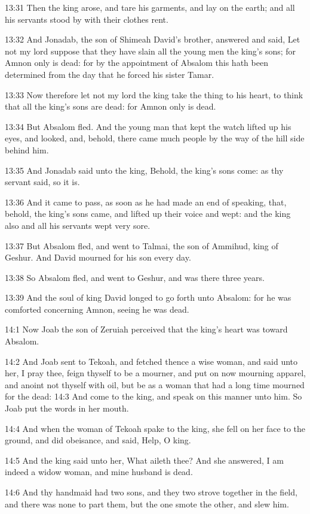 13:31 Then the king arose, and tare his garments, and lay on the earth; and all his servants stood by with their clothes rent.

13:32 And Jonadab, the son of Shimeah David's brother, answered and said, Let not my lord suppose that they have slain all the young men the king's sons; for Amnon only is dead: for by the appointment of Absalom this hath been determined from the day that he forced his sister Tamar.

13:33 Now therefore let not my lord the king take the thing to his heart, to think that all the king's sons are dead: for Amnon only is dead.

13:34 But Absalom fled. And the young man that kept the watch lifted up his eyes, and looked, and, behold, there came much people by the way of the hill side behind him.

13:35 And Jonadab said unto the king, Behold, the king's sons come: as thy servant said, so it is.

13:36 And it came to pass, as soon as he had made an end of speaking, that, behold, the king's sons came, and lifted up their voice and wept: and the king also and all his servants wept very sore.

13:37 But Absalom fled, and went to Talmai, the son of Ammihud, king of Geshur. And David mourned for his son every day.

13:38 So Absalom fled, and went to Geshur, and was there three years.

13:39 And the soul of king David longed to go forth unto Absalom: for he was comforted concerning Amnon, seeing he was dead.

14:1 Now Joab the son of Zeruiah perceived that the king's heart was toward Absalom.

14:2 And Joab sent to Tekoah, and fetched thence a wise woman, and said unto her, I pray thee, feign thyself to be a mourner, and put on now mourning apparel, and anoint not thyself with oil, but be as a woman that had a long time mourned for the dead: 14:3 And come to the king, and speak on this manner unto him. So Joab put the words in her mouth.

14:4 And when the woman of Tekoah spake to the king, she fell on her face to the ground, and did obeisance, and said, Help, O king.

14:5 And the king said unto her, What aileth thee? And she answered, I am indeed a widow woman, and mine husband is dead.

14:6 And thy handmaid had two sons, and they two strove together in the field, and there was none to part them, but the one smote the other, and slew him.

